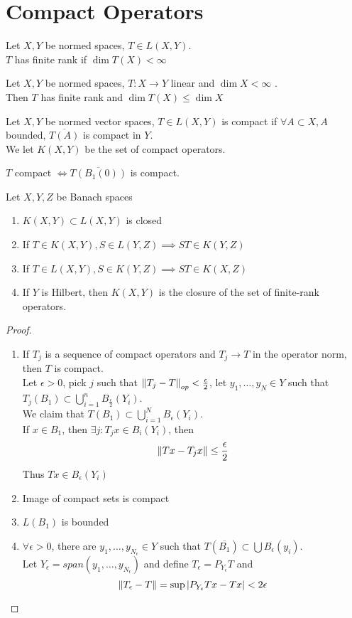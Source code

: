 \documentclass[../main.tex]{subfiles}
\begin{document}
\section{Compact Operators}
\begin{defn}
	Let $X,Y$ be normed spaces, $T\in L( X,Y) $.\\
	$T$ has finite rank if $\dim T( X) < \infty $
\end{defn}
\begin{lemma}
Let $X,Y$ be normed spaces, $T:X\to Y$ linear and $\dim X < \infty $ .\\
Then $T$ has finite rank and $\dim T( X) \leq \dim X$ 
\end{lemma}
\begin{defn}
	Let $X,Y$ be normed vector spaces, $T\in L( X,Y) $ is compact if $\forall A \subset X,A $ bounded, $\overline{T( A) }$ is compact in $Y$.\\
	We let $K( X,Y) $ be the set of compact operators.
\end{defn}
\begin{lemma}
$T$ compact $\iff \overline{T( B_1( 0) ) }$ is compact.
\end{lemma}
\begin{thm}
	Let $X,Y,Z$ be Banach spaces
	\begin{enumerate}
	\item $K( X,Y) \subset L( X,Y) $ is closed
	\item If $T\in K( X,Y)  , S\in L( Y,Z) \implies ST \in K( Y,Z) $ 
	\item If $T\in L( X,Y) , S \in K( Y,Z) \implies ST \in K( X,Z) $ 
	\item If $Y$ is Hilbert, then $K( X,Y) $ is the closure of the set of finite-rank operators.
	\end{enumerate}
\end{thm}
\begin{proof}
\begin{enumerate}
\item If $T_j$ is a sequence of compact operators and $T_j \to T$ in the operator norm, then $T$ is compact.\\
	Let $\epsilon>0$, pick $j$ such that $\left\lVert T_j - T\right\rVert_{op} < \frac{\epsilon}{2}$, let $y_1,\ldots,y_N\in Y$ such that $T_j ( B_1) \subset \bigcup_{i=1}^{n}B_{\frac{\epsilon}{2}} ( Y_i)  $.\\
	We claim that $T( B_1) \subset  \bigcup_{i=1}^{N} B_{\epsilon} ( Y_i) $.\\
	If $x\in B_1$, then $\exists j: T_j x \in B_i ( Y_i) $, then
	\[ 
	\left\lVert Tx -T_j x\right\rVert \leq \frac{\epsilon}{2}
	\]
	Thus $Tx \in B_{\epsilon} ( Y_i) $ 
\item Image of compact sets is compact
\item $L( B_1)  $ is bounded
\item $\forall \epsilon>0$, there are $y_1,\ldots,y_{N_{\epsilon} } \in Y$ such that $T(  \overline{B_1}) \subset \bigcup B_\epsilon( y_i) $.\\
	Let $Y_\epsilon = span(y_1,\ldots,y_{N_\epsilon} ) $ and define $T_\epsilon = P_{Y_\epsilon} T$ and 
	\[ 
	\left\lVert T_\epsilon - T\right\rVert = \sup | P_{Y_\epsilon} T x - Tx| < 2\epsilon
	\]
\end{enumerate}
\end{proof}
\end{document}
